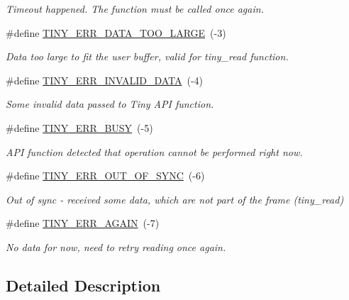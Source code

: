 \begin{DoxyCompactItemize}
\begin{DoxyCompactList}\small\item\em Timeout happened. The function must be called once again. \end{DoxyCompactList}\item 
\mbox{\label{group__ERROR__FLAGS_ga7bbe7440d11ad304b0af68e011f4eab7}} 
\#define \hyperlink{group__ERROR__FLAGS_ga7bbe7440d11ad304b0af68e011f4eab7}{T\+I\+N\+Y\+\_\+\+E\+R\+R\+\_\+\+D\+A\+T\+A\+\_\+\+T\+O\+O\+\_\+\+L\+A\+R\+GE}~(-\/3)
\begin{DoxyCompactList}\small\item\em Data too large to fit the user buffer, valid for tiny\+\_\+read function. \end{DoxyCompactList}\item 
\mbox{\label{group__ERROR__FLAGS_ga541a9e67a84e39595ad647d641c4df2e}} 
\#define \hyperlink{group__ERROR__FLAGS_ga541a9e67a84e39595ad647d641c4df2e}{T\+I\+N\+Y\+\_\+\+E\+R\+R\+\_\+\+I\+N\+V\+A\+L\+I\+D\+\_\+\+D\+A\+TA}~(-\/4)
\begin{DoxyCompactList}\small\item\em Some invalid data passed to Tiny A\+PI function. \end{DoxyCompactList}\item 
\mbox{\label{group__ERROR__FLAGS_ga9b3e170e1c6ce269f216ef4a1ac61995}} 
\#define \hyperlink{group__ERROR__FLAGS_ga9b3e170e1c6ce269f216ef4a1ac61995}{T\+I\+N\+Y\+\_\+\+E\+R\+R\+\_\+\+B\+U\+SY}~(-\/5)
\begin{DoxyCompactList}\small\item\em A\+PI function detected that operation cannot be performed right now. \end{DoxyCompactList}\item 
\mbox{\label{group__ERROR__FLAGS_gae1949de45d9c478830dad9c9b996193a}} 
\#define \hyperlink{group__ERROR__FLAGS_gae1949de45d9c478830dad9c9b996193a}{T\+I\+N\+Y\+\_\+\+E\+R\+R\+\_\+\+O\+U\+T\+\_\+\+O\+F\+\_\+\+S\+Y\+NC}~(-\/6)
\begin{DoxyCompactList}\small\item\em Out of sync -\/ received some data, which are not part of the frame (tiny\+\_\+read) \end{DoxyCompactList}\item 
\mbox{\label{group__ERROR__FLAGS_gab15347e8e9f90d709d94d9c151d505b7}} 
\#define \hyperlink{group__ERROR__FLAGS_gab15347e8e9f90d709d94d9c151d505b7}{T\+I\+N\+Y\+\_\+\+E\+R\+R\+\_\+\+A\+G\+A\+IN}~(-\/7)
\begin{DoxyCompactList}\small\item\em No data for now, need to retry reading once again. \end{DoxyCompactList}\end{DoxyCompactItemize}


\subsection{Detailed Description}
